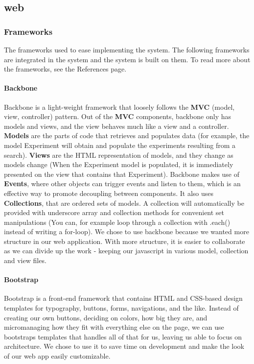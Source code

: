 \subsection{web}
\subsubsection{Frameworks}
\label{sec:web_frame}
The frameworks used to ease implementing the system. The following frameworks are integrated in the system and the system is built on them. To read more about the frameworks, see the References page.
\paragraph{Backbone}
Backbone\cite{web_1} is a light-weight framework that loosely follows the \textbf{MVC} (model, view, controller) pattern. Out of the \textbf{MVC} components, backbone only has models and views, and the view behaves much like a view and a controller. \textbf{Models} are the parts of code that retrieves and populates data (for example, the model Experiment will obtain and populate the experiments resulting from a search). \textbf{Views} are the HTML representation of models, and they change as models change (When the Experiment model is populated, it is immediately presented on the view that contains that Experiment).
Backbone makes use of \textbf{Events}, where other objects can trigger events and listen to them, which is an effective way to promote decoupling between components. It also uses \textbf{Collections}, that are ordered sets of models. A collection will automatically be provided with underscore array and collection methods for convenient set manipulations (You can, for example loop through a collection with .each() instead of writing a for-loop). We chose to use backbone because we wanted more structure in our web application. With more structure, it is easier to collaborate as we can divide up the work - keeping our javascript in various model, collection and view files.

\paragraph{Bootstrap}
Bootstrap\cite{web_2} is a front-end framework that contains HTML and CSS-based design templates for typography, buttons, forms, navigations, and the like. Instead of creating our own buttons, deciding on colors, how big they are, and micromanaging how they fit with everything else on the page, we can use bootstraps templates that handles all of that for us, leaving us able to focus on architecture. We chose to use it to save time on development and make the look of our web app easily customizable.
